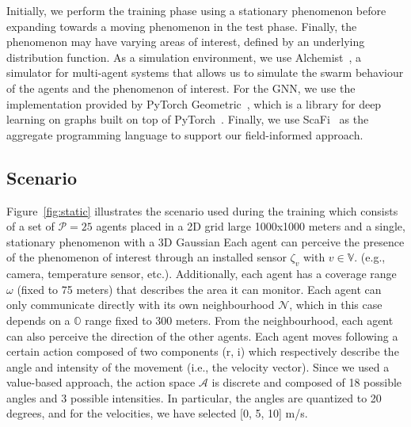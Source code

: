 \documentclass[conference]{IEEEtran}
\begin{document}
Initially, 
  we perform the training phase using a stationary phenomenon before expanding towards a moving phenomenon in the test phase. 
  Finally, the phenomenon may have varying areas of interest, defined by an underlying distribution function. 
As a simulation environment, we use Alchemist~\cite{alchemist}, 
 a simulator for multi-agent systems that allows us to simulate the swarm behaviour of the agents 
 and the phenomenon of interest.
For the \ac{GNN}, we use the implementation provided by PyTorch Geometric~\cite{Fey/Lenssen/2019}, 
 which is a library for deep learning on graphs built on top of PyTorch~\cite{torch}.
Finally, we use ScaFi~\cite{casadei2022scafi} as the aggregate programming language to support 
 our field-informed approach.

\subsection{Scenario}
Figure~\ref{fig:static} illustrates the scenario used during the training %
which consists of a set of $\mathcal{P} = 25$ agents placed in a 2D grid large 1000x1000 meters and a single, stationary phenomenon with a 3D Gaussian 
Each agent can perceive the presence
 of the phenomenon of interest through an installed sensor $\zeta_v$ with $v \in \mathbb{V}$. 
 (e.g., camera, temperature sensor, etc.). 
%
Additionally, each agent has a coverage range $\omega$ (fixed to 75 meters) 
 that describes the area it can monitor. 
 Each agent can only communicate directly with its own neighbourhood $\mathcal{N}$, 
 which in this case depends on a $\mathbb{O}$ range fixed to 300 meters. %
From the neighbourhood, 
 each agent can also perceive the direction of the other agents.
%
Each agent moves following a certain action composed of two components (r, i) 
 which respectively describe the angle and intensity of the movement (i.e., the velocity vector).
Since we used a value-based approach, 
 the action space $\mathcal{A}$ is discrete and composed of 18 possible angles and 3 possible intensities.
In particular, the angles are quantized to 20 degrees, and for the velocities, we have selected [0, 5, 10] m/s.
%
\end{document}
